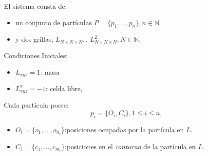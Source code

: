 \documentclass[spanish,unknownkeysallowed]{beamer}
\begin{document}
\begin{frame}
El sistema consta de:
\begin{itemize}
\item un conjunto de partículas $P = \{p_{1}, ... , p_{n}\}, n  \in \mathbb{N}$
\item y dos grillas, $L_{N\times N \times N},$, $L^{2}_{N\times N \times N}, N \in \mathbb{N}.$
\end{itemize}

Condiciones Iniciales:
\begin{itemize}
\item $L_{xyz}=1$: masa
\item $L^{2}_{xyz}=-1$: celda libre,
\end{itemize}

Cada partícula posee:
\begin{equation*}
  p_{i} = \{O_{i}, C_{i}\}, 1 \le i \le n,
\end{equation*}

\begin{itemize}
\item $O_{i} = \{o_{1}, ... , o_{n_{i}}\}$:posiciones ocupadas por la part\'icula en $L$.

\item $C_{i} = \{c_{1}, ... , c_{m_{i}}\}$:posiciones en el {\em contorno} de la part\'icula en $L$.
\end{itemize}

\end{frame}

\begin{frame}

\begin{algorithm}[H]
\begin{algorithmic}[1]
        \ENDIF
            \ENDIF
        \ENDFOR
\end{algorithmic}
\end{algorithm}
\end{frame}
\end{document}
